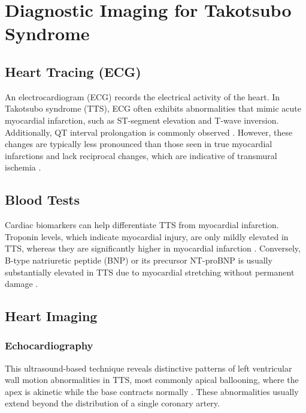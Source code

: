 \documentclass[12pt, BSc]{muthesis}
\begin{document}

\section{Diagnostic Imaging for Takotsubo Syndrome}

\subsection{Heart Tracing (ECG)}

An electrocardiogram (ECG) records the electrical activity of the heart. In Takotsubo syndrome (TTS), ECG often exhibits abnormalities that mimic acute myocardial infarction, such as ST-segment elevation and T-wave inversion. Additionally, QT interval prolongation is commonly observed \cite{Gianni2006}. However, these changes are typically less pronounced than those seen in true myocardial infarctions and lack reciprocal changes, which are indicative of transmural ischemia \cite{PRASAD2008408}.

\subsection{Blood Tests}

Cardiac biomarkers can help differentiate TTS from myocardial infarction. Troponin levels, which indicate myocardial injury, are only mildly elevated in TTS, whereas they are significantly higher in myocardial infarction \cite{Gianni2006}. Conversely, B-type natriuretic peptide (BNP) or its precursor NT-proBNP is usually substantially elevated in TTS due to myocardial stretching without permanent damage \cite{GUPTA2018165}.

\subsection{Heart Imaging}
\subsubsection{Echocardiography}
This ultrasound-based technique reveals distinctive patterns of left ventricular wall motion abnormalities in TTS, most commonly apical ballooning, where the apex is akinetic while the base contracts normally \cite{DiazNavarro2021}. These abnormalities usually extend beyond the distribution of a single coronary artery.
\end{document}
